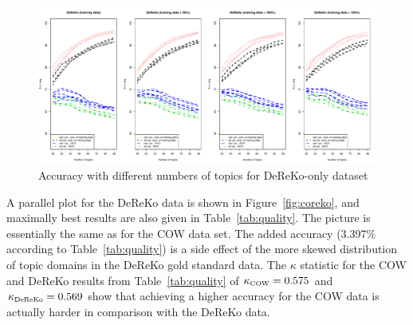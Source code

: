 \documentclass[11pt]{article}
\begin{document}
\begin{table}[h]
  \centering
  \caption{Evaluation at best achievable accuracy with the reduced set of topic domains in 10-fold cross-validation; Precision, Recall, and F-Measure are weighted averages across all categories}
  \label{tab:quality}
\end{table}

\begin{figure}[h]
  \centering
  \includegraphics[width=\textwidth]{graphics/dereko.pdf}
  \caption{Accuracy with different numbers of topics for DeReKo-only dataset}
  \label{fig:dereko}
\end{figure}

A parallel plot for the DeReKo data is shown in Figure~\ref{fig:coreko}, and maximally best results are also given in Table~\ref{tab:quality}.
The picture is essentially the same as for the COW data set.
The added accuracy (3.397\% according to Table~\ref{tab:quality}) is a side effect of the more skewed distribution of topic domains in the DeReKo gold standard data.
The $\kappa$ statistic for the COW and DeReKo results from Table~\ref{tab:quality} of $\kappa_{\textrm{\tiny COW}}=0.575$ and $\kappa_{\textrm{\tiny DeReKo}}=0.569$ show that achieving a higher accuracy for the COW data is actually harder in comparison with the DeReKo data.
\end{document}
